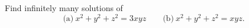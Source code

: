 Find infinitely many solutions of
\[ \text{(a)}\ x^2 + y^2 + z^2 = 3xyz\qquad \text{(b)}\ x^2 + y^2 + z^2 = xyz. \]
